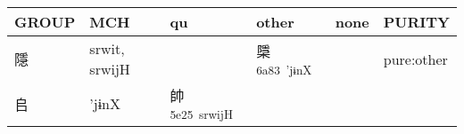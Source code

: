 \documentclass[14pt,a4paper]{scrartcl}
\begin{document}
\begin{longtable}[c]{@{}llllll@{}}
\toprule
\begin{minipage}[b]{0.14\columnwidth}\raggedright\strut
GROUP
\strut\end{minipage} &
\begin{minipage}[b]{0.14\columnwidth}\raggedright\strut
MCH
\strut\end{minipage} &
\begin{minipage}[b]{0.14\columnwidth}\raggedright\strut
qu
\strut\end{minipage} &
\begin{minipage}[b]{0.14\columnwidth}\raggedright\strut
other
\strut\end{minipage} &
\begin{minipage}[b]{0.14\columnwidth}\raggedright\strut
none
\strut\end{minipage} &
\begin{minipage}[b]{0.14\columnwidth}\raggedright\strut
PURITY
\strut\end{minipage}\tabularnewline
\midrule
\endhead
\begin{minipage}[t]{0.14\columnwidth}\raggedright\strut
隱
\strut\end{minipage} &
\begin{minipage}[t]{0.14\columnwidth}\raggedright\strut
srwit, srwijH
\strut\end{minipage} &
\begin{minipage}[t]{0.14\columnwidth}\raggedright\strut
\strut\end{minipage} &
\begin{minipage}[t]{0.14\columnwidth}\raggedright\strut
檃\textsuperscript{6a83~'jɨnX}
\strut\end{minipage} &
\begin{minipage}[t]{0.14\columnwidth}\raggedright\strut
\strut\end{minipage} &
\begin{minipage}[t]{0.14\columnwidth}\raggedright\strut
pure:other
\strut\end{minipage}\tabularnewline
\begin{minipage}[t]{0.14\columnwidth}\raggedright\strut
𠂤
\strut\end{minipage} &
\begin{minipage}[t]{0.14\columnwidth}\raggedright\strut
'jɨnX
\strut\end{minipage} &
\begin{minipage}[t]{0.14\columnwidth}\raggedright\strut
帥\textsuperscript{5e25~srwijH}
\strut\end{minipage} &

\end{longtable}
\end{document}
